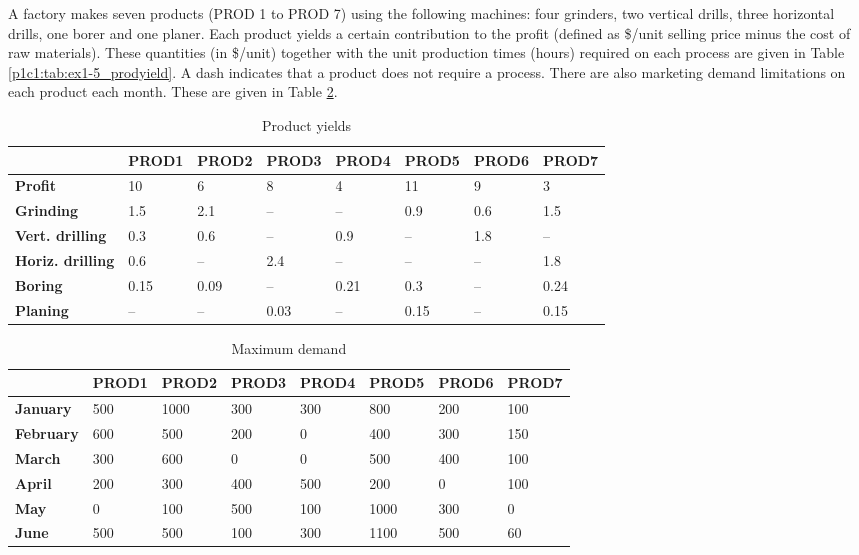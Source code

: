 A factory makes seven products (PROD 1 to PROD 7) using the
following machines: four grinders, two vertical drills, three horizontal drills, one
borer and one planer. Each product yields a certain contribution to the profit (defined
as \$/unit selling price minus the cost of raw materials). These quantities (in \$/unit)
together with the unit production times (hours) required on each process are given
in Table \ref{p1c1:tab:ex1-5_prodyield}. A dash indicates that a product does not require a process. 
There are also marketing demand limitations on each product each month. These are given in Table \ref{p1c1:tab:ex1-5_max_demand}.

\begin{table}[h]
	\begin{tabular}{l|lllllll}
		& \textbf{PROD1} & \textbf{PROD2} & \textbf{PROD3} & \textbf{PROD4} & \textbf{PROD5} & \textbf{PROD6} & \textbf{PROD7} \\ \hline 
		\textbf{Profit} & 10    & 6     & 8     & 4     & 11    & 9     & 3     \\
		\textbf{Grinding}              & 1.5   & 2.1   & –     & –     & 0.9   & 0.6   & 1.5   \\
		\textbf{Vert. drilling}     & 0.3   & 0.6   & –     & 0.9   & –     & 1.8   & –     \\
		\textbf{Horiz. drilling}   & 0.6   & –     & 2.4   & –     & –     & –     & 1.8   \\
		\textbf{Boring}                & 0.15  & 0.09  & –     & 0.21  & 0.3   & –     & 0.24  \\
		\textbf{Planing}               & –     & –     & 0.03  & –     & 0.15  & –     & 0.15 \\ \hline
	\end{tabular}
	\caption{Product yields}
	\label{p1c1:tab:ex1-5_prod_yield}
\end{table}

\begin{table}[H]
	\begin{tabular}{l|lllllll}
		& \textbf{PROD1} & \textbf{PROD2} & \textbf{PROD3} & \textbf{PROD4} & \textbf{PROD5} & \textbf{PROD6} & \textbf{PROD7} \\ \hline
		\textbf{January}   & 500   & 1000  & 300   & 300   & 800   & 200   & 100   \\
		\textbf{February}  & 600   & 500   & 200   & 0     & 400   & 300   & 150   \\
		\textbf{March}     & 300   & 600   & 0     & 0     & 500   & 400   & 100   \\
		\textbf{April}     & 200   & 300   & 400   & 500   & 200   & 0     & 100   \\
		\textbf{May}       & 0     & 100   & 500   & 100   & 1000  & 300   & 0     \\
		\textbf{June}      & 500   & 500   & 100   & 300   & 1100  & 500   & 60    \\ \hline
	\end{tabular}
	\caption{Maximum demand}
	\label{p1c1:tab:ex1-5_max_demand}
\end{table}

